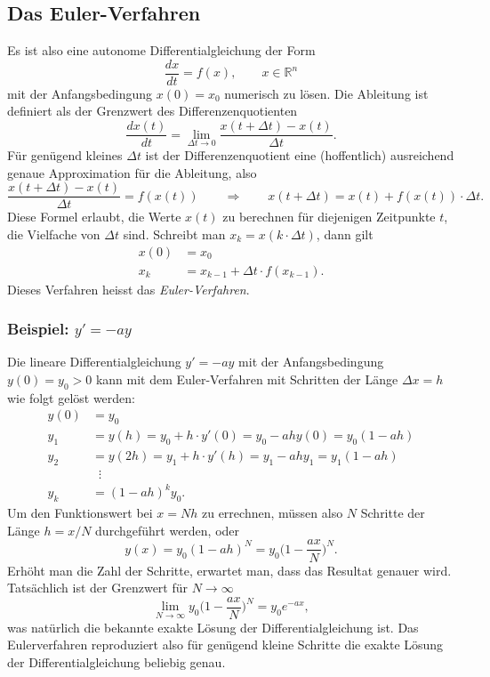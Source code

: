 %
%
%
\subsection{Das Euler-Verfahren\label{subsection:euler}}
Es ist also eine autonome Differentialgleichung der Form
\[
\frac{dx}{dt} = f(x),\qquad x\in\mathbb R^n
\]
mit der Anfangsbedingung $x(0)=x_0$ numerisch zu lösen.
Die Ableitung ist definiert als der Grenzwert des Differenzenquotienten
\[
\frac{dx(t)}{dt}
=
\lim_{\Delta t\to 0}
\frac{x(t+\Delta t)-x(t)}{\Delta t}.
\]
Für genügend kleines $\Delta t$ ist der Differenzenquotient eine
(hoffentlich) ausreichend genaue Approximation für die Ableitung,
also
\begin{equation}
\frac{x(t+\Delta t)-x(t)}{\Delta t} = f(x(t))
\qquad\Rightarrow\qquad
x(t+\Delta t) = x(t) + f(x(t))\cdot \Delta t.
\label{skript:euler:differenzenquotient}
\end{equation}
Diese Formel erlaubt, die Werte $x(t)$ zu berechnen für diejenigen
Zeitpunkte $t$, die Vielfache von $\Delta t$ sind.
Schreibt man $x_k = x(k\cdot \Delta t)$, dann gilt
\begin{align*}
x(0) &= x_0\\
x_k &= x_{k-1} + \Delta t \cdot f(x_{k-1}).
\end{align*}
Dieses Verfahren heisst das {\em Euler-Verfahren}.
%

\subsubsection{Beispiel: $y'=-ay$}
Die lineare Differentialgleichung $y'=-ay$ mit der Anfangsbedingung 
$y(0)=y_0 > 0$ kann mit dem Euler-Verfahren mit Schritten der Länge $\Delta x=h$
wie folgt gelöst werden:
\begin{align*}
y(0)&=y_0\\
y_1&=y(h) = y_0 + h\cdot y'(0) = y_0  -ah y(0) = y_0(1 - ah)
\\
y_2&=y(2h) = y_1 + h\cdot y'(h) = y_1  -ah y_1 = y_1(1-ah)
\\
&\;\;\vdots
\\
y_k&= (1-ah)^k y_0.
\end{align*}
Um den Funktionswert bei $x=Nh$ zu errechnen, müssen also $N$ Schritte der
Länge $h=x/N$ durchgeführt werden, oder
\[
y(x) = y_0(1-ah)^N =
y_0
\biggl(
1-\frac{ax}{N}
\biggr)^N.
\]
Erhöht man die Zahl der Schritte, erwartet man, dass das Resultat genauer
wird.
Tatsächlich ist der Grenzwert für $N\to\infty$
\[
\lim_{N\to\infty} y_0\biggl(1-\frac{ax}{N}\biggr)^N
=
y_0
e^{-ax},
\]
was natürlich die bekannte exakte Lösung der Differentialgleichung ist.
Das Eulerverfahren reproduziert also für genügend kleine Schritte 
die exakte Lösung der Differentialgleichung beliebig genau.

